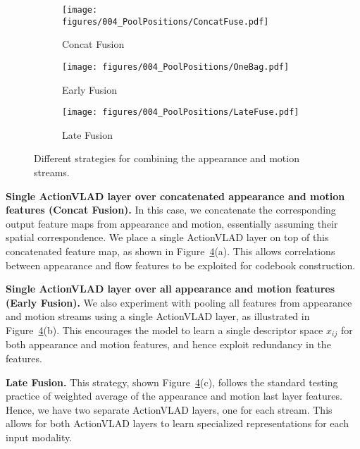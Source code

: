 \documentclass[10pt,twocolumn,letterpaper]{article}
\newcommand{\methodTag}[0]{ActionVLAD}
\begin{document}
\begin{figure}
    \centering
    \begin{subfigure}{0.32\linewidth} \centering
     \texttt{[image: figures/004\_PoolPositions/ConcatFuse.pdf]}
     \caption{Concat Fusion}\label{fig:rgbflow:concat}
   \end{subfigure}
   \begin{subfigure}{0.32\linewidth} \centering
     \texttt{[image: figures/004\_PoolPositions/OneBag.pdf]}
     \caption{Early Fusion}\label{fig:rgbflow:onebag}
   \end{subfigure}
   \begin{subfigure}{0.32\linewidth} \centering
     \texttt{[image: figures/004\_PoolPositions/LateFuse.pdf]}
     \caption{Late Fusion}\label{fig:rgbflow:late}
   \end{subfigure}
    \caption{Different strategies for combining the appearance and motion streams.
        }\label{fig:rgbflow-pooling}
\end{figure}



{\noindent \bf Single \methodTag{} layer over concatenated appearance and motion features (Concat Fusion).}
In this case, we concatenate the corresponding output feature maps from appearance and motion, essentially assuming their spatial correspondence. We place a single \methodTag{} layer on top of this concatenated feature map, as shown in Figure~\ref{fig:rgbflow-pooling}(a). This allows correlations between appearance and flow features to be exploited for codebook construction.

{\noindent \bf Single \methodTag{} layer over all appearance and motion features (Early Fusion).}
We also experiment with pooling all features from appearance and motion streams
using a single \methodTag{} layer, as illustrated in Figure~\ref{fig:rgbflow-pooling}(b). This encourages the model to learn a single descriptor space $x_{ij}$ for both appearance and motion features,
and hence exploit redundancy in the features.

{\noindent \bf Late Fusion.}
This strategy, shown Figure~\ref{fig:rgbflow-pooling}(c), follows the standard testing practice of weighted average of the appearance and motion
last layer features.
Hence, we have 
two separate \methodTag{} layers, one for each stream.
This allows for both \methodTag{} layers to learn specialized representations
for each input modality.
\end{document}
